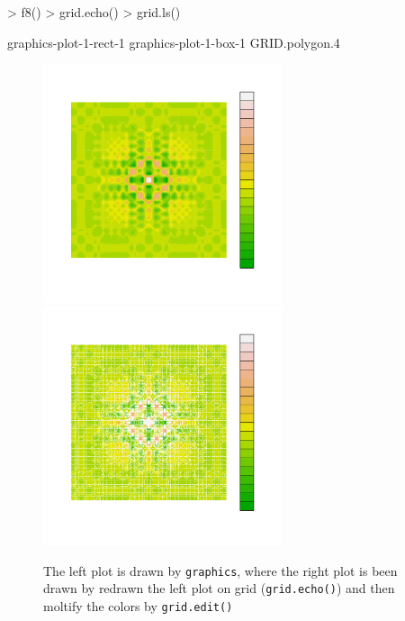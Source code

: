 \documentclass[paper=a4, fontsize=11pt]{report}
\begin{document}
\begin{Schunk}
\begin{Sinput}
> f8()
> grid.echo()
> grid.ls()
\end{Sinput}
\begin{Soutput}
graphics-plot-1-rect-1
graphics-plot-1-box-1
GRID.polygon.4
\end{Soutput}
\end{Schunk}



\begin{figure}[h]
\begin{center}
  \includegraphics[height = 7cm, width = 7cm]{figure/Chapter6_example_2_2.pdf}
  \includegraphics[height = 7cm, width = 7cm]{figure/Chapter6_example_2_3.pdf}
  \caption{The left plot is drawn by \texttt{graphics}, where the right plot is been drawn by redrawn the left plot on grid (\texttt{grid.echo()}) and then moltify the colors by \texttt{grid.edit()}}
  	\label{Example_6.1}
\end{center}
\end{figure}
\end{document}
